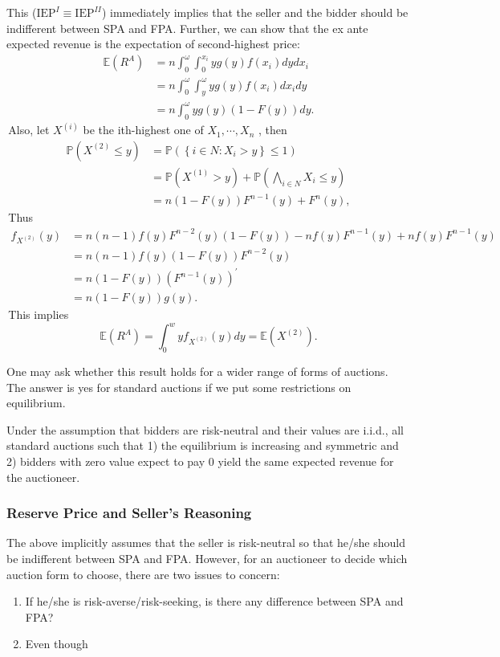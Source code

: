 This ($\mathrm{IEP}^{I}\equiv \mathrm{IEP}^{II}$) immediately implies that the seller and the bidder should be indifferent between SPA and FPA. Further, we can show that the ex ante expected revenue is the expectation of second-highest price:
$$\begin{aligned}
\mathbb{E}\left(R^{A}\right) & =n \int_{0}^{\omega} \int_{0}^{x_{i}} y g(y) f\left(x_{i}\right) d y d x_{i} \\
& =n \int_{0}^{\omega} \int_{y}^{\omega} y g(y) f\left(x_{i}\right) d x_{i} d y \\
& =n \int_{0}^{\omega} y g(y)(1-F(y)) d y.
\end{aligned}$$
\,Also, let  $X^{(i)}$  be the ith-highest one of  $X_{1}, \cdots, X_{n}$ , then
$$\begin{aligned}
\mathbb{P}\left(X^{(2)} \leqslant y\right) & =\mathbb{P}\left(\left\{i \in N: X_{i}>y\right\} \leqslant 1\right) \\
& =\mathbb{P}\left(X^{(1)}>y\right)+\mathbb{P}\left(\bigwedge_{i \in N} X_{i} \leqslant y\right) \\
& =n(1-F(y)) F^{n-1}(y)+F^{n}(y),
\end{aligned}$$
\,Thus
$$\begin{aligned}
f_{X^{(2)}}(y) & =n(n-1) f(y) F^{n-2}(y)(1-F(y))-n f(y) F^{n-1}(y)+n f(y) F^{n-1}(y) \\
& =n(n-1) f(y)(1-F(y)) F^{n-2}(y) \\
& =n(1-F(y))\left(F^{n-1}(y)\right)^{\prime} \\
& =n(1-F(y)) g(y).
\end{aligned}$$
\,This implies
$$\mathbb{E}\left(R^{A}\right)=\int_{0}^{w} y f_{X^{(2)}}(y) d y=\mathbb{E}\left(X^{(2)}\right).$$

One may ask whether this result holds for a wider range of forms of auctions. The answer is yes for standard auctions if we put some restrictions on equilibrium.
\begin{theorem} \label{thm:REP}
    Under the assumption that bidders are risk-neutral and their values are i.i.d., all standard auctions such that 1) the equilibrium is increasing and symmetric and 2) bidders with zero value expect to pay 0 yield the same expected revenue for the auctioneer.
\end{theorem}
\subsubsection{Reserve Price and Seller's Reasoning}
The above implicitly assumes that the seller is risk-neutral so that he/she should be indifferent between SPA and FPA. However, for an auctioneer to decide which auction form to choose, there are two issues to concern:
\begin{enumerate}
    \item If he/she is risk-averse/risk-seeking, is there any difference between SPA and FPA?
    \item Even though
\end{enumerate}

